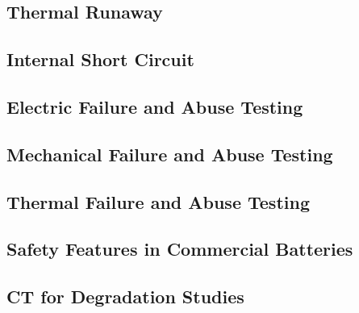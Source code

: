 \subsection{Thermal Runaway}
\label{sec:thermal-runaway}

\subsection{Internal Short Circuit}
\label{sec:internal-short-circuit}

\subsection{Electric Failure and Abuse Testing}
\label{sec:electric-failure-abuse-testing}

\subsection{Mechanical Failure and Abuse Testing}
\label{sec:mechanical-failure-abuse-testing}

\subsection{Thermal Failure and Abuse Testing}
\label{sec:thermal-failure-abuse-testing}

\subsection{Safety Features in Commercial Batteries}
\label{sec:safety-features}

\subsection{CT for Degradation Studies}
\label{sec:ct-degradation-studies}